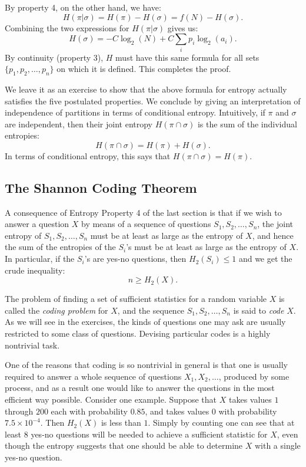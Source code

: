 \documentclass{report}
\begin{document}
By property 4, on the other hand, we have:
\[
H(\pi|\sigma) = H(\pi) - H(\sigma) = f(N) - H(\sigma).
\]
Combining the two expressions for \( H(\pi|\sigma) \) gives us:
\[
H(\sigma) = -C \log_2(N) + C \sum_{i} p_i \log_2(a_i).
\]
By continuity (property 3), \( H \) must have this same formula for all sets \( \{p_1, p_2, \ldots, p_n\} \) on which it is defined. This completes the proof.

We leave it as an exercise to show that the above formula for entropy actually satisfies the five postulated properties. We conclude by giving an interpretation of independence of partitions in terms of conditional entropy. Intuitively, if \( \pi \) and \( \sigma \) are independent, then their joint entropy \( H(\pi \cap \sigma) \) is the sum of the individual entropies:
\[
H(\pi \cap \sigma) = H(\pi) + H(\sigma).
\]
In terms of conditional entropy, this says that \( H(\pi \cap \sigma) = H(\pi) \).

\subsection*{The Shannon Coding Theorem}

A consequence of Entropy Property 4 of the last section is that if we wish to answer a question \( X \) by means of a sequence of questions \( S_1, S_2, \ldots, S_n \), the joint entropy of \( S_1, S_2, \ldots, S_n \) must be at least as large as the entropy of \( X \), and hence the sum of the entropies of the \( S_i \)'s must be at least as large as the entropy of \( X \). In particular, if the \( S_i \)'s are yes-no questions, then \( H_2(S_i) \leq 1 \) and we get the crude inequality:
\[
n \geq H_2(X).
\]

The problem of finding a set of sufficient statistics for a random variable \( X \) is called the \emph{coding problem} for \( X \), and the sequence \( S_1, S_2, \ldots, S_n \) is said to \emph{code} \( X \). As we will see in the exercises, the kinds of questions one may ask are usually restricted to some class of questions. Devising particular codes is a highly nontrivial task.

One of the reasons that coding is so nontrivial in general is that one is usually required to answer a whole sequence of questions \( X_1, X_2, \ldots \), produced by some process, and as a result one would like to answer the questions in the most efficient way possible. Consider one example. Suppose that \( X \) takes values \( 1 \) through \( 200 \) each with probability \( 0.85 \), and takes values \( 0 \) with probability \( 7.5 \times 10^{-4} \). Then \( H_2(X) \) is less than \( 1 \). Simply by counting one can see that at least \( 8 \) yes-no questions will be needed to achieve a sufficient statistic for \( X \), even though the entropy suggests that one should be able to determine \( X \) with a single yes-no question.
\end{document}
